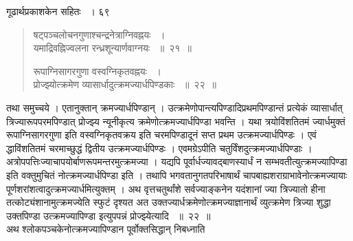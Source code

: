 \documentclass[11pt, openany]{book}
\begin{document}
\hspace{3cm} गूढार्थप्रकाशकेन सहितः ~। \hfill ६९
\vspace{1cm}
\begin{quote}

{\ssi षट्पञ्चलोचनगुणाश्चन्द्रनेत्राग्निवह्नयः ~।\\
यमाद्रिवह्निज्वलना रन्ध्रशून्यार्णवाग्नयः ~॥~२१~॥

रूपाग्निसागरगुणा वस्वग्निकृतवह्नयः ~।\\
प्रोज्झ्योत्क्रमेण व्यासार्धादुत्क्रमज्यार्धपिण्डकाः ~॥~२२~॥}
\end{quote}
\begin{sloppypar}
तथा समुच्चये । एतानुक्तान् क्रमज्यार्धपिण्डान् । उत्क्रमेणोपान्त्यपिण्डादिप्रथमपिण्डान्तं प्रत्येकं व्यासार्धात् त्रिज्यारूपपरमपिण्डात् प्रोज्झ्य न्यूनीकृत्य क्रमेणोत्क्रमज्यार्धपिण्डा भवन्ति । यथा त्रयोविंशतितमं ज्यार्धमुक्तं रूपाग्निसागरगुणा इति वस्वग्निकृतवक्रय इति चरमपिण्डादूनं सप्त प्रथम उत्क्रमज्यार्धपिण्डः । एवं द्धाविंशतितमं चरमाच्छुद्धं द्वितीय उत्क्रमज्यार्धपिण्डः । एवमग्रेऽपीति चतुर्विंशदुत्क्रमज्यार्धपिण्डाः । अत्रोपपत्तिः\textendash ज्याचापयोर्बाणरूपमन्तरमुत्क्रमज्या । यद्यपि पूर्वार्धज्यावद्बाणस्यार्धं न सम्भवतीत्युत्क्रमज्यापिण्डा इति वक्तुमुचितं नोत्क्रमज्यार्धपिण्डा इति । तथापि भगवतानुगतपरिभाषार्थं चापबाह्यशराग्राभावेनोत्क्रमज्यायाः पूर्णशरांशत्वादुत्क्रमज्यार्धमित्युक्तम् । अथ वृत्तचतुर्थांशे सर्वज्याङ्कनेन यदंशानां ज्या त्रिज्यातो हीना तत्कोट्यंशानामुत्क्रमज्येति स्फुटं दृश्यत अत उक्तज्यार्धक्रमेणोत्क्रमज्याज्ञानार्थं व्युत्क्रमेण त्रिज्या शुद्धा उक्तपिण्डा उत्क्रमज्यापिण्डा इत्युपपन्नं प्रोज्झ्येत्यादि ~॥~२२~॥\\
\noindent अथ श्लोकपञ्चकेनोत्क्रमज्यापिण्डान पूर्वोक्तसिद्धान् निबध्नाति\textendash
\end{sloppypar}
\newpage
\end{document}
